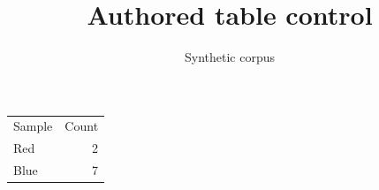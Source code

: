 \documentclass{article}
\title{Authored table control}
\author{Synthetic corpus}
\date{}
\begin{document}
\maketitle
\ifdefined\tagpdfsetup{}\fi
\begin{tabular}{lr}
Sample & Count\\
Red & 2\\
Blue & 7\\
\end{tabular}
\end{document}
